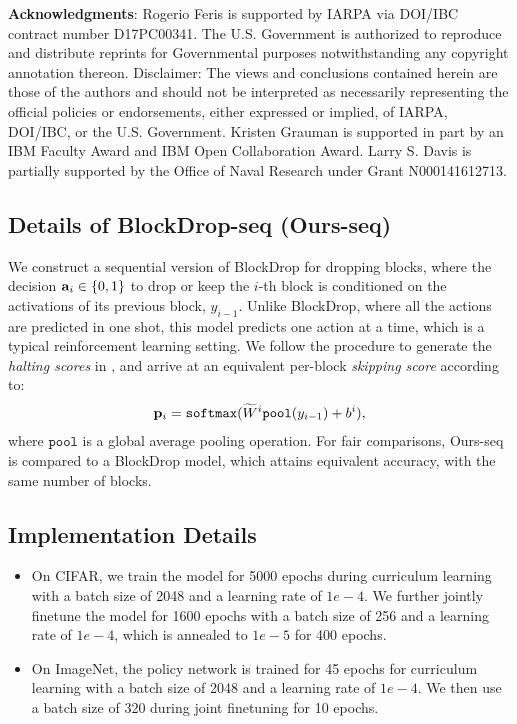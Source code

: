 \documentclass[10pt,twocolumn,letterpaper]{article}
\newcommand{\system}{BlockDrop\xspace}
\begin{document}
{\scriptsize \noindent\textbf{Acknowledgments}: Rogerio Feris is supported by IARPA via DOI/IBC contract number D17PC00341. The U.S. Government is authorized to reproduce and distribute reprints for Governmental purposes notwithstanding any copyright annotation thereon. Disclaimer: The views and conclusions contained herein are those of the authors and should not be interpreted as necessarily representing the official policies or endorsements, either expressed or implied, of IARPA, DOI/IBC, or the U.S. Government. Kristen Grauman is supported in part by an IBM Faculty Award and IBM Open Collaboration Award. Larry S. Davis is partially supported by the Office of Naval Research under Grant N000141612713.}

{\small


}

\clearpage
{}



\subsection*{Details of BlockDrop-seq (Ours-seq)}
We construct a sequential version of \system for dropping blocks, where the decision ${\bf a}_i \in \{0,1\}$ to drop or keep the $i$-th block is conditioned on the activations of its previous block, $y_{i-1}$. Unlike \system, where all the actions are predicted in one shot, this model predicts one action at a time, which is a typical reinforcement learning setting. We follow the procedure to generate the \emph{halting scores} in \cite{figurnov2017spatially}, and arrive at an equivalent per-block \emph{skipping score}
according to:
\begin{align*}{\bf p}_i = \texttt{softmax}(\widetilde{W}^i \texttt{pool}(y_{i-1}) + b^i),
\end{align*}
where $\texttt{pool}$ is a global average pooling operation.
For fair comparisons, Ours-seq is compared to a \system model, which attains equivalent accuracy, with the same number of blocks.


\subsection*{Implementation Details}
\begin{itemize}

  \item On CIFAR, we train the model for 5000 epochs during curriculum learning with a batch size of 2048 and a learning rate of $1e-4$. We further jointly finetune the model for 1600 epochs with a batch size of 256 and a learning rate of $1e-4$, which is annealed to $1e-5$ for 400 epochs.
  
  \item On ImageNet, the policy network is trained for 45 epochs for curriculum learning with a batch size of 2048 and a learning rate of $1e-4$. We then use a batch size of 320 during joint finetuning for 10 epochs.
  
\end{itemize} 
\end{document}
